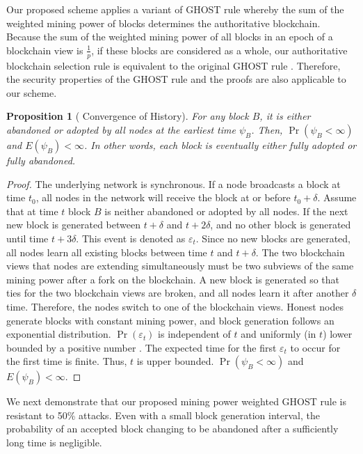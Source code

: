 \documentclass[10pt,journal,compsoc]{IEEEtran}
\newtheorem{proposition}{Proposition}
\begin{document}
	Our proposed scheme applies a variant of GHOST rule whereby the sum of the weighted mining power of blocks determines the authoritative blockchain. Because the sum of the weighted mining power of all blocks in an epoch of a blockchain view is $\frac{1}{p}$, if these blocks are considered as a whole, our authoritative blockchain selection rule is equivalent to the original GHOST rule \cite{sompolinsky2015secure}. Therefore, the security properties of the GHOST rule and the proofs are also applicable to our scheme. 
	
	\begin{proposition}[ Convergence of History] \label{Proposition0}
		For any block $B$, it is either abandoned or adopted by all nodes at the earliest time $\psi_B$. Then, $\Pr(	\psi_B<\infty)$ and $E (\psi_B)<\infty$. In other words, each block is eventually either fully adopted or fully abandoned.
	\end{proposition}
	\begin{proof}%
		The underlying network is  synchronous. If a node broadcasts a block at time $t_0$, all nodes in the network will receive the block at or before $t_0 + \delta$. Assume that at time $t$ block $B$ is neither abandoned or adopted by all nodes. If the next new block is generated between $t+\delta$ and $t+2\delta$, and no other block is generated until time $t+3\delta$. This event is denoted as $\varepsilon_t$. 
		Since no new blocks are generated, all nodes learn all existing blocks between time $t$ and $t+\delta$.  The two blockchain views that nodes are extending simultaneously must be two subviews of the same mining power after a fork on the blockchain. 
		A new block is generated so that ties for the two blockchain views are broken, and all nodes learn it after another $\delta$ time. Therefore, the nodes switch to one of the blockchain views. Honest nodes generate blocks with constant mining power, and block generation follows an exponential distribution. $\Pr(\varepsilon_t)$ is independent of $t$ and uniformly (in $t$) lower bounded by a positive number \cite{sompolinsky2015secure}. The expected time for the first $\varepsilon_t$ to occur for the first time is finite. Thus, $t$ is upper bounded. $\Pr(	\psi_B<\infty)$ and $E (\psi_B)<	\infty$.
	\end{proof}
	
	We next demonstrate that our proposed mining power weighted GHOST rule is resistant to 50\% attacks. Even with a small block generation interval, the probability of an accepted block changing to be abandoned after a sufficiently long time is negligible. 
	
\end{document}

